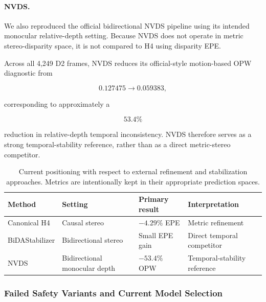 \documentclass[11pt,a4paper]{article}
\begin{document}
\paragraph{NVDS.}
We also reproduced the official bidirectional NVDS pipeline using its
intended monocular relative-depth setting.
Because NVDS does not operate in metric stereo-disparity space, it is
not compared to H4 using disparity EPE.

Across all 4,249 D2 frames, NVDS reduces its official-style
motion-based OPW diagnostic from

\[
0.127475 \rightarrow 0.059383,
\]

corresponding to approximately a

\[
\boxed{53.4\%}
\]

reduction in relative-depth temporal inconsistency.
NVDS therefore serves as a strong temporal-stability reference, rather
than as a direct metric-stereo competitor.


\begin{table}[t]
    \centering
    \caption{
        Current positioning with respect to external refinement and
        stabilization approaches.
        Metrics are intentionally kept in their appropriate prediction
        spaces.
    }
    \label{tab:external_comparison_status}
    \small
    \begin{tabular}{llll}
        \toprule
        Method &
        Setting &
        Primary result &
        Interpretation \\
        \midrule
        Canonical H4
            & Causal stereo
            & $-4.29\%$ EPE
            & Metric refinement \\

        BiDAStabilizer
            & Bidirectional stereo
            & Small EPE gain
            & Direct temporal competitor \\

        NVDS
            & Bidirectional monocular depth
            & $-53.4\%$ OPW
            & Temporal-stability reference \\
        \bottomrule
    \end{tabular}
\end{table}


\subsubsection{Failed Safety Variants and Current Model Selection}
\end{document}
